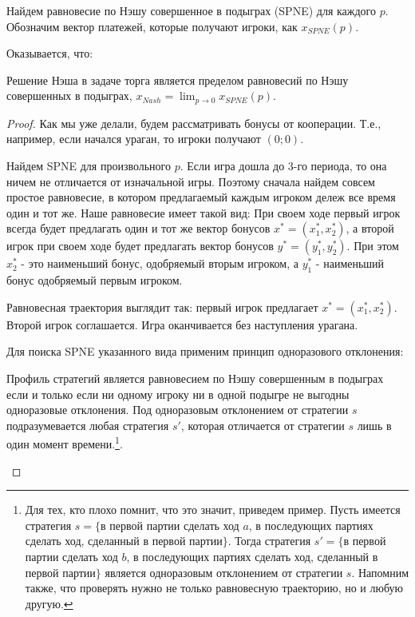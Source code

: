 Найдем равновесие по Нэшу совершенное в подыграх (SPNE)  для каждого
$p$. Обозначим вектор платежей, которые получают игроки, как $x_{SPNE}(p)$.

Оказывается, что:

\begin{myth} Решение Нэша в задаче торга является пределом равновесий
по Нэшу совершенных в подыграх, $x_{Nash}=\lim_{p\to 0}x_{SPNE}(p)$.
\end{myth}

\begin{proof}

Как мы уже делали, будем рассматривать бонусы от кооперации. Т.е.,
например, если начался ураган, то игроки получают $(0;0)$. 

Найдем SPNE для произвольного $p$. Если игра дошла до 3-го периода,
то она ничем не отличается от изначальной игры. Поэтому сначала найдем
совсем простое равновесие, в котором предлагаемый каждым игроком дележ
все время один и тот же. Наше равновесие имеет такой вид: При своем
ходе первый игрок всегда будет предлагать один и тот же вектор бонусов
$x^{*}=(x_{1}^{*},x_{2}^{*})$, а второй игрок при своем ходе будет
предлагать вектор бонусов $y^{*}=(y_{1}^{*},y_{2}^{*})$. При этом
$x_{2}^{*}$ - это наименьший бонус, одобряемый вторым игроком, а
$y_{1}^{*}$ - наименьший бонус одобряемый первым игроком. 

Равновесная траектория выглядит так: первый игрок предлагает $x^{*}=(x_{1}^{*},x_{2}^{*})$. Второй игрок соглашается. Игра оканчивается без наступления урагана.

Для поиска SPNE указанного вида применим принцип одноразового отклонения: 

\begin{myth}
Профиль стратегий является равновесием по Нэшу совершенным в подыграх
если и только если ни одному игроку ни в одной подыгре не выгодны
одноразовые отклонения. Под одноразовым отклонением от стратегии $s$
подразумевается любая стратегия $s'$, которая отличается от стратегии
$s$ лишь в один момент времени.\footnote{Для тех, кто плохо помнит, что это значит, приведем пример.
Пусть имеется стратегия $s=\{$в первой партии сделать ход $a$, в последующих
партиях сделать ход, сделанный в первой партии$\}$. Тогда стратегия
$s'=\{$в первой партии сделать ход $b$, в последующих партиях сделать
ход, сделанный в первой партии$\}$ является одноразовым отклонением
от стратегии $s$. Напомним также, что проверять нужно не только равновесную
траекторию, но и любую другую.%
}.


\end{myth}
\end{proof}
